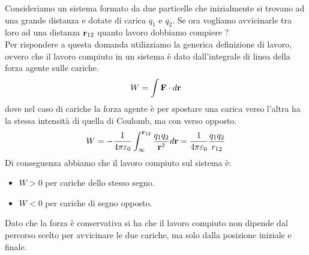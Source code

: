 \noindent Consideriamo un sistema formato da due particelle che inizialmente si trovano ad una grande distanza e dotate di carica $q_1$ e $q_2$. Se ora vogliamo avvicinarle tra loro ad una distanza $\bold{r}_{12}$ quanto lavoro dobbiamo compiere ?
\\
Per rispondere a questa domanda utilizziamo la generica definizione di lavoro, ovvero che il lavoro compiuto in un sistema \`e dato dall'integrale di linea della forza agente sulle cariche.
\begin{equation*}
	W = \int \bold{F} \cdot d\bold{r}
\end{equation*}
dove nel caso di cariche la forza agente \`e per spostare una carica verso l'altra ha la stessa intensit\`a di quella di Coulomb, ma con verso opposto.
\begin{equation}
	W = -\frac{1}{4 \pi \varepsilon_0} \int _{\infty}^{\bold{r}_{12}}\frac{q_1q_2}{\bold{r}^2}d\bold{r} = \frac{1}{4 \pi \varepsilon_0} \frac{q_1q_2}{r_{12}}
\end{equation} 
Di conseguenza abbiamo che il lavoro compiuto sul sistema \`e:
\begin{itemize}
	\item $W > 0$ per cariche dello stesso segno.
	\item $W < 0$ per cariche di segno opposto.
 \end{itemize}
 Dato che la forza \`e conservativa si ha che il lavoro compiuto non dipende dal percorso scelto per avvicinare le due cariche, ma solo dalla posizione iniziale e finale.
 \\
 

